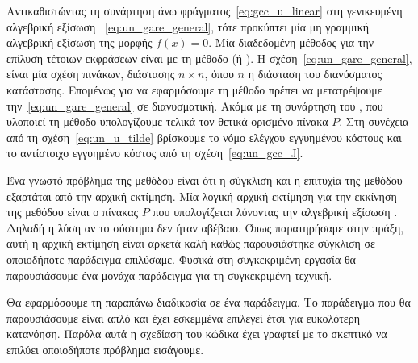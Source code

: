 Αντικαθιστώντας τη συνάρτηση άνω φράγματος~\eqref{eq:gcc_u_linear} στη
γενικευμένη αλγεβρική εξίσωση ~\eqref{eq:un_gare_general}, τότε
προκύπτει μία μη γραμμική αλγεβρική εξίσωση της μορφής \( f(x) = 0 \). Μία
διαδεδομένη μέθοδος για την επίλυση τέτοιων εκφράσεων είναι με τη μέθοδο
 (ή ). Η σχέση~\eqref{eq:un_gare_general}, είναι
μία σχέση πινάκων, διάστασης \( n \times n \), όπου \( n \) η διάσταση του
διανύσματος κατάστασης. Επομένως για να εφαρμόσουμε τη μέθοδο 
πρέπει να μετατρέψουμε την~\eqref{eq:un_gare_general} σε διανυσματική. Ακόμα με
τη συνάρτηση  του , που υλοποιεί τη μέθοδο
 υπολογίζουμε τελικά τον θετικά
ορισμένο πίνακα \( P \). Στη συνέχεια από τη σχέση~\eqref{eq:un_u_tilde}
βρίσκουμε το νόμο ελέγχου εγγυημένου κόστους και το αντίστοιχο εγγυημένο
κόστος από τη σχέση~\eqref{eq:un_gcc_J}.

Ένα γνωστό πρόβλημα της μεθόδου  είναι ότι η σύγκλιση και
η επιτυχία της μεθόδου εξαρτάται από την αρχική εκτίμηση. Μία λογική αρχική
εκτίμηση για την εκκίνηση της μεθόδου είναι ο πίνακας \( P \) που υπολογίζεται
λύνοντας την αλγεβρική εξίσωση . Δηλαδή η λύση αν το σύστημα δεν
ήταν αβέβαιο. Όπως παρατηρήσαμε στην πράξη, αυτή η αρχική εκτίμηση είναι αρκετά
καλή καθώς παρουσιάστηκε σύγκλιση σε οποιοδήποτε παράδειγμα επιλύσαμε. Φυσικά
στη συγκεκριμένη εργασία θα παρουσιάσουμε ένα μονάχα παράδειγμα για τη
συγκεκριμένη τεχνική.

Θα εφαρμόσουμε τη παραπάνω διαδικασία σε ένα παράδειγμα. Το παράδειγμα που θα
παρουσιάσουμε είναι απλό και έχει εσκεμμένα επιλεγεί έτσι για ευκολότερη κατανόηση.
Παρόλα αυτά η σχεδίαση του κώδικα έχει γραφτεί με το σκεπτικό να επιλύει οποιοδήποτε
πρόβλημα εισάγουμε.

